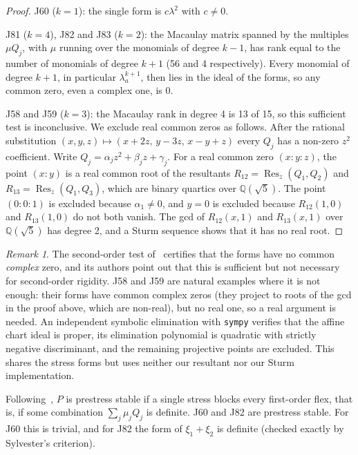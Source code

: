 \documentclass[11pt]{amsart}
\theoremstyle{remark}
\newtheorem{remark}[theorem]{Remark}
\newcommand{\Q}{\mathbb Q}
\begin{document}
\begin{proof}
J60 ($k=1$): the single form is $c\lambda^2$ with $c\neq0$.

J81 ($k=4$), J82 and J83 ($k=2$): the Macaulay matrix spanned by the multiples $\mu Q_j$, with $\mu$ running over the monomials of degree $k-1$, has rank equal to the number of monomials of degree $k+1$ (56 and 4 respectively). Every monomial of degree $k+1$, in particular $\lambda_a^{k+1}$, then lies in the ideal of the forms, so any common zero, even a complex one, is $0$.

J58 and J59 ($k=3$): the Macaulay rank in degree 4 is 13 of 15, so this sufficient test is inconclusive. We exclude real common zeros as follows. After the rational substitution $(x,y,z)\mapsto(x+2z,\,y-3z,\,x-y+z)$ every $Q_j$ has a non-zero $z^2$ coefficient. Write $Q_j=\alpha_jz^2+\beta_jz+\gamma_j$. For a real common zero $(x:y:z)$, the point $(x:y)$ is a real common root of the resultants $R_{12}=\operatorname{Res}_z(Q_1,Q_2)$ and $R_{13}=\operatorname{Res}_z(Q_1,Q_3)$, which are binary quartics over $\Q(\sqrt5)$. The point $(0:0:1)$ is excluded because $\alpha_1\neq0$, and $y=0$ is excluded because $R_{12}(1,0)$ and $R_{13}(1,0)$ do not both vanish. The gcd of $R_{12}(x,1)$ and $R_{13}(x,1)$ over $\Q(\sqrt5)$ has degree 2, and a Sturm sequence shows that it has no real root.
\end{proof}

\begin{remark}
The second-order test of~\cite[Sec.~6]{AHWZ2026} certifies that the forms have no common \emph{complex} zero, and its authors point out that this is sufficient but not necessary for second-order rigidity. J58 and J59 are natural examples where it is not enough: their forms have common complex zeros (they project to roots of the gcd in the proof above, which are non-real), but no real one, so a real argument is needed. An independent symbolic elimination with \texttt{sympy} verifies that the affine chart ideal is proper, its elimination polynomial is quadratic with strictly negative discriminant, and the remaining projective points are excluded. This shares the stress forms but uses neither our resultant nor our Sturm implementation.
\end{remark}

Following~\cite{CW1996,AHWZ2026}, $P$ is prestress stable if a single stress blocks every first-order flex, that is, if some combination $\sum_j\mu_jQ_j$ is definite. J60 and J82 are prestress stable. For J60 this is trivial, and for J82 the form of $\xi_1+\xi_2$ is definite (checked exactly by Sylvester's criterion).
\end{document}
